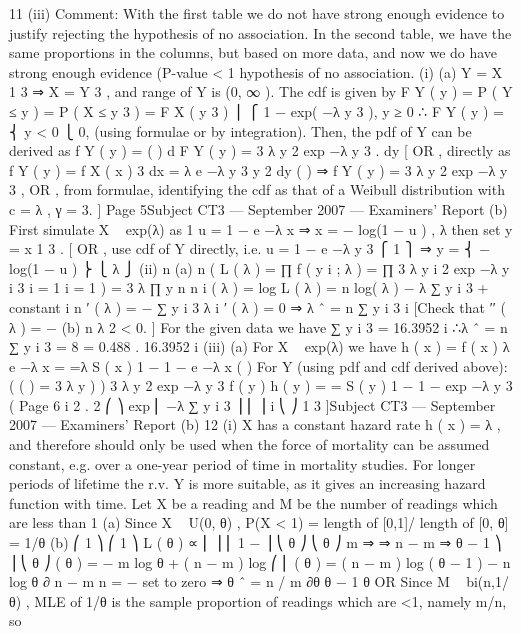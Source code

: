 \documentclass[a4paper,12pt]{article}
\begin{document}
\begin{enumerate}
11
(iii) Comment: With the first table we do not have strong enough evidence to
justify rejecting the hypothesis of no association. In the second table, we have
the same proportions in the columns, but based on more data, and now we do
have strong enough evidence (P-value < 1%
hypothesis of no association.
(i) (a)
Y = X
1
3
⇒ X = Y 3 , and range of Y is (0, ∞ ).
The cdf is given by
F Y ( y ) = P ( Y ≤ y ) = P ( X ≤ y 3 ) = F X ( y 3 )
⎪ ⎧ 1 − exp( −λ y 3 ), y ≥ 0
∴ F Y ( y ) = ⎨
y < 0
⎩ 0,
(using formulae or by integration).
Then, the pdf of Y can be derived as
f Y ( y ) =
(
)
d
F Y ( y ) = 3 λ y 2 exp −λ y 3 .
dy
[ OR , directly as
f Y ( y ) = f X ( x )
3
dx
= λ e −λ y 3 y 2
dy
(
)
⇒ f Y ( y ) = 3 λ y 2 exp −λ y 3 ,
OR , from formulae, identifying the cdf as that of a Weibull distribution
with c = λ , γ = 3. ]
Page 5Subject CT3  — September 2007 — Examiners’ Report
(b)
First simulate X ~ exp(λ) as
1
u = 1 − e −λ x ⇒ x = − log(1 − u ) ,
λ
then set y = x
1
3 .
[ OR , use cdf of Y directly, i.e. u = 1 − e
−λ y 3
⎧ 1
⎫
⇒ y = ⎨ − log(1 − u ) ⎬
⎩ λ
⎭
(ii)
n
(a)
n
{
(
L ( λ ) = ∏ f ( y i ; λ ) = ∏ 3 λ y i 2 exp −λ y i 3
i = 1
i = 1
) } = 3 λ ∏ y
n n
i
( λ ) = log L ( λ ) = n log( λ ) − λ ∑ y i 3 + constant
i
n
′ ( λ ) = − ∑ y i 3
λ i
′ ( λ ) = 0 ⇒ λ ˆ =
n
∑ y i 3
i
[Check that ′′ ( λ ) = −
(b)
n
λ 2
< 0. ]
For the given data we have
∑ y i 3 = 16.3952
i
∴λ ˆ =
n
∑ y i
3
=
8
= 0.488 .
16.3952
i
(iii)
(a)
For X ~ exp(λ) we have
h ( x ) =
f ( x )
λ e −λ x
=
=λ
S ( x ) 1 − 1 − e −λ x
(
)
For Y (using pdf and cdf derived above):
(
(
) = 3 λ y
) )
3 λ y 2 exp −λ y 3
f ( y )
h ( y ) =
=
S ( y ) 1 − 1 − exp −λ y 3
(
Page 6
i
2
.
2
⎛
⎞
exp ⎜ −λ ∑ y i 3 ⎟
⎜
⎟
i
⎝
⎠
1
3
]Subject CT3  — September 2007 — Examiners’ Report
(b)
12
(i)
X has a constant hazard rate h ( x ) = λ , and therefore should only be
used when the force of mortality can be assumed constant, e.g. over a
one-year period of time in mortality studies. For longer periods of
lifetime the r.v. Y is more suitable, as it gives an increasing hazard
function with time.
Let X be a reading and M be the number of readings which are less than 1
(a) Since X ~ U(0, θ) , P(X < 1) = length of [0,1]/ length of [0, θ] = 1/θ
(b) ⎛ 1 ⎞ ⎛ 1 ⎞
L ( θ ) ∝ ⎜ ⎟ ⎜ 1 − ⎟
⎝ θ ⎠ ⎝ θ ⎠
m
⇒
⇒
n − m
⇒
θ − 1 ⎞
⎟
⎝ θ ⎠
( θ ) = − m log θ + ( n − m ) log ⎛ ⎜
( θ ) = ( n − m ) log ( θ − 1 ) − n log θ
∂
n − m n
=
−
set to zero ⇒ θ ˆ = n / m
∂θ θ − 1 θ
OR Since M ~ bi(n,1/θ) , MLE of 1/θ is the sample proportion of
readings which are <1, namely m/n, so

\end{enumerate}
\end{document}
